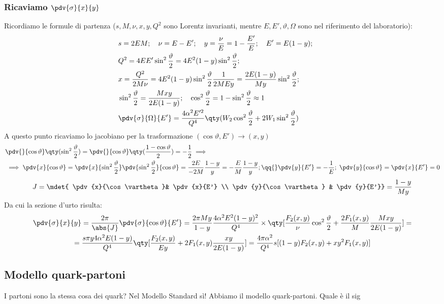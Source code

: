 \subsubsection{Ricaviamo $\pdv{\sigma}{x}{y}$}
Ricordiamo le formule di partenza ($s,M,\nu,x,y,Q^2$ sono Lorentz invarianti, mentre $E,E',\vartheta,\Omega$ sono nel riferimento del laboratorio):
\begin{align*}
&s=2EM;\quad\nu=E-E';\quad y=\frac{\nu}{E}=1-\frac{E'}{E};\quad E'=E(1-y);\\
&Q^2=4EE'\sin^2\frac{\vartheta}{2}=4E^2(1-y)\sin^2\frac{\vartheta}{2};\\
&x=\frac{Q^2}{2M\nu}=4E^2(1-y)\sin^2\frac{\vartheta}{2}\frac{1}{2MEy}=\frac{2E(1-y)}{My}\sin^2\frac{\vartheta}{2};\\
&\sin^2\frac{\vartheta}{2}=\frac{Mxy}{2E(1-y)};\quad\cos^2\frac{\vartheta}{2}=1-\sin^2\frac{\vartheta}{2}\approx1 \\
&\pdv{\sigma}{\Omega}{E'}=\frac{4\alpha^2E'^2}{Q^4}\qty(W_2\cos^2\frac{\vartheta}{2}+2W_1\sin^2\frac{\vartheta}{2})&&
\end{align*}
A questo punto ricaviamo lo jacobiano per la trasformazione $(\cos\vartheta,E')\to(x,y)$
\begin{align*}
&\pdv{}{\cos\vartheta}\qty(\sin^2\frac{\vartheta}{2})=\pdv{}{\cos\vartheta}\qty(\frac{1-\cos\vartheta}{2})=-\frac{1}{2}\implies\\
& \implies \pdv{x}{\cos\vartheta}=\pdv{x}{\sin^2\frac{\vartheta}{2}}\pdv{\sin^2\frac{\vartheta}{2}}{\cos\vartheta}=\frac{2E}{-2M}\frac{1-y}{y}=-\frac{E}{M}\frac{1-y}{y};\qq{} \pdv{y}{E'}=-\frac{1}{E};\;\pdv{y}{\cos\vartheta}=\pdv{x}{E'}=0
\end{align*}
\begin{equation*}
    J=\mdet{ \pdv{x}{\cos\vartheta}& \pdv{x}{E'} \\ \pdv{y}{\cos\vartheta} & \pdv{y}{E'}}=\frac{1-y}{My}
\end{equation*}
Da cui la sezione d'urto risulta:
\begin{gather*}
    \pdv{\sigma}{x}{y}=\frac{2\pi}{\abs{J}}\pdv{\sigma}{\cos\vartheta}{E'}=\frac{2\pi My}{1-y}\frac{4\alpha^2E^2(1-y)^2}{Q^4}\times\qty[\frac{F_2(x,y)}{\nu}\cos^2\frac{\vartheta}{2}+\frac{2F_1(x,y)}{M}\frac{Mxy}{2E(1-y)}]=\\
    =\frac{s\pi y4\alpha^2E(1-y)}{Q^4}\qty[\frac{F_2(x,y)}{Ey}+2F_1(x,y)\frac{xy}{2E(1-y)}]=\frac{4\pi \alpha^2}{Q^4}s[(1-y)F_2(x,y)+xy^2F_1(x,y)]
\end{gather*}
\subsection{Modello quark-partoni}
I partoni sono la stessa cosa dei quark? Nel Modello Standard sì! Abbiamo il modello quark-partoni. Quale è il sig
